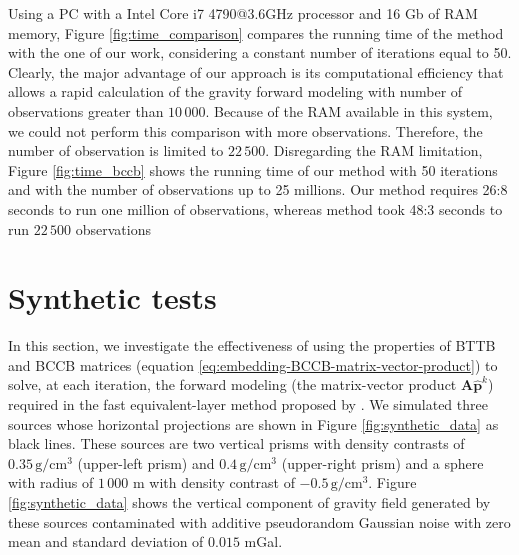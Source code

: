 \documentclass[manuscript,revised]{geophysics}
\begin{document}
Using a PC with a Intel Core i7 4790@3.6GHz processor and 16 Gb of RAM memory, Figure \ref{fig:time_comparison}  compares the running time  of the  \citet{siqueira-etal2017} method with the one of our work, considering a constant number of iterations equal to 50. Clearly, the major advantage of our approach is its computational efficiency that allows a rapid calculation of the gravity forward modeling  with number of observations greater than $10\,000$. Because of the RAM available in this system, we could not perform this comparison with more observations. Therefore, the number of observation is limited to $22\,500$. Disregarding the RAM limitation, Figure \ref{fig:time_bccb} shows the running time of our method with 50 iterations and with the number of observations up to  25 millions. Our method requires 26:8 seconds to run one million of observations, whereas \citet{siqueira-etal2017} method took 48:3 seconds to run $22\,500$ observations


\section{Synthetic tests}
In this section, we  investigate the effectiveness of using the properties of BTTB and BCCB matrices (equation \ref{eq:embedding-BCCB-matrix-vector-product})  to solve, at each iteration, the forward modeling (the matrix-vector product $\mathbf{A} \hat{\mathbf{p}}^k$)  required in the fast equivalent-layer method proposed by \citet{siqueira-etal2017}.  We simulated three sources whose horizontal projections are shown in Figure \ref{fig:synthetic_data} as black lines.  These sources are two vertical prisms with density contrasts of $0.35\, \mathrm{g/cm^3}$ (upper-left prism) and $0.4\, \mathrm{g/cm^3}$ (upper-right prism) and a sphere with radius of $1\,000$ m with density contrast of $-0.5\, \mathrm{g/cm^3}$. Figure \ref{fig:synthetic_data}  shows the vertical component of gravity field generated by these sources contaminated with additive pseudorandom Gaussian noise with zero mean and standard deviation of $0.015$ mGal.
 
\end{document}

